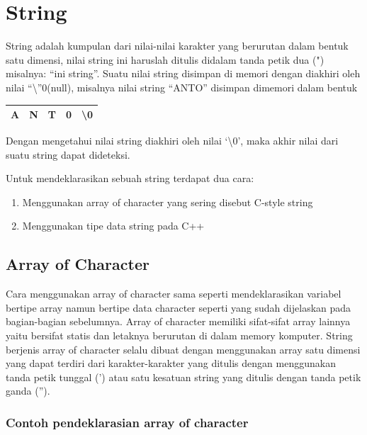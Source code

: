 \section{String}\label{string}

String adalah kumpulan dari nilai-nilai karakter yang berurutan dalam
bentuk satu dimensi, nilai string ini haruslah ditulis didalam tanda
petik dua (") misalnya: ``ini string''. Suatu nilai string disimpan di
memori dengan diakhiri oleh nilai ``\textbackslash{}''0(null), misalnya nilai string
``ANTO'' disimpan dimemori dalam bentuk

\begin{tabular}{|c|c|c|c|c|}
\hline
A & N & T & 0 & \textbackslash{0}\\ \hline
\end{tabular}


Dengan mengetahui nilai string diakhiri oleh nilai `\textbackslash{}0', maka akhir
nilai dari suatu string dapat dideteksi.

Untuk mendeklarasikan sebuah string terdapat dua cara:

\begin{enumerate}


\item
  Menggunakan array of character yang sering disebut 
  C-style string
\item
  Menggunakan tipe data string pada C++
\end{enumerate}

\subsection{Array of Character}\label{array-of-character}

Cara menggunakan array of character sama seperti mendeklarasikan
variabel bertipe array namun bertipe data character seperti yang sudah
dijelaskan pada bagian-bagian sebelumnya. Array of character memiliki
sifat-sifat array lainnya yaitu bersifat statis dan letaknya berurutan
di dalam memory komputer. String berjenis array of character selalu
dibuat dengan menggunakan array satu dimensi yang dapat terdiri dari
karakter-karakter yang ditulis dengan menggunakan tanda petik tunggal
(') atau satu kesatuan string yang ditulis dengan tanda petik ganda
('').

\subsubsection*{Contoh pendeklarasian array of character}

